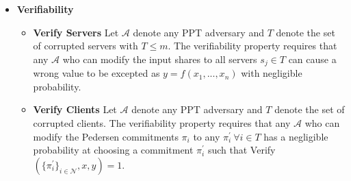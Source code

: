\begin{itemize}
\begin{itemize}
   		 \end{itemize} 
 	\item \textbf{Verifiability} 
 			\begin{itemize}
 						\item \textbf{Verify Servers }Let $\mathcal{A}$ denote any PPT  adversary and $T$ denote the set of corrupted servers with $T\leq m$. The verifiability 							property requires that any $\mathcal{A}$ who can modify the input shares to all servers $s_j\in T$ can cause a wrong value to be excepted as 							$y=f(x_1,...,x_n)$ with negligible probability.   
 						\item \textbf{Verify Clients} Let $\mathcal{A}$ denote any PPT adversary and $T$ denote the set of corrupted clients. The verifiability property requires that any $\mathcal{A}$ who can modify the Pedersen commitments $\pi_i$  to any $\pi_i^{'} \:\forall  i\in T$ has a negligible probability at choosing a commitment $\pi_i^{'}$ such that Verify$( \{\pi^{'}_i\}_{i\in\mathcal{N}},x,y)=1$.
 			\end{itemize} 
\end{itemize}


